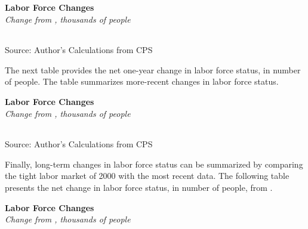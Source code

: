 \documentclass{report}
\begin{document}
{\begin{minipage}{0.76\textwidth}
\normalsize \textbf{Labor Force Changes}\\
\footnotesize{\textit{Change from \unskip, thousands of people}}\\
\noindent {} \setlength{\tabcolsep}{3.0pt} \color{black!90}
		{\renewcommand{\arraystretch}{1.5}
		 \begin{tabular}{p{27.8mm} R{11.2mm} R{10.4mm} R{10.4mm} R{10.2mm} 
		 				 R{10.6mm} R{10.4mm} R{10.4mm}}
			  \hline
		\end{tabular}}
		\vspace{-3mm}
		
\footnotesize{Source: Author's Calculations from CPS}
\end{minipage}
\newpage
\begin{minipage}{0.76\textwidth} \small The next table provides the net one-year change in labor force status, in number of people. The table summarizes more-recent changes in labor force status. 
\vspace{1mm}

\normalsize \textbf{Labor Force Changes}\\
\footnotesize{\textit{Change from \unskip, thousands of people}}\\
\noindent {} \setlength{\tabcolsep}{3.0pt} \color{black!90}
		{\renewcommand{\arraystretch}{1.5}
		 \begin{tabular}{p{27.8mm} R{11.2mm} R{10.4mm} R{10.4mm} R{10.2mm} 
		 				 R{10.6mm} R{10.4mm} R{10.4mm}}
			  \hline
		\end{tabular}}
		\vspace{-3mm}
		
\footnotesize{Source: Author's Calculations from CPS}
\vspace{4mm}

\small Finally, long-term changes in labor force status can be summarized by comparing the tight labor market of 2000 with the most recent data. The following table presents the net change in labor force status, in number of people, from \unskip.
\vspace{1mm}

\normalsize \textbf{Labor Force Changes}\\
\footnotesize{\textit{Change from \unskip, thousands of people}}\\
\noindent {} \setlength{\tabcolsep}{3.0pt} \color{black!90}
		{\renewcommand{\arraystretch}{1.5}
		 \begin{tabular}{p{27.8mm} R{11.2mm} R{10.4mm} R{10.4mm} R{10.2mm} 
		 				 R{10.6mm} R{10.4mm} R{10.4mm}}
			  \hline
		\end{tabular}}
		\vspace{-3mm}
		

\end{minipage}}
\end{document}
